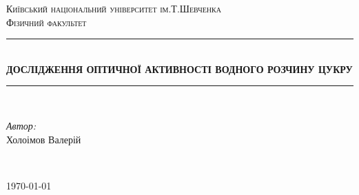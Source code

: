 \center
\newcommand{\HRule}{\rule{\linewidth}{0.3 mm}} %
\textsc{\Large Київський національний університет ім.Т.Шевченка }\\[1.5cm] %
\textsc{\Large Фізичний факультет}\\[2.5cm] %


\HRule \\[0.4cm]
{ \huge \bfseries ДОСЛІДЖЕННЯ ОПТИЧНОЇ АКТИВНОСТІ ВОДНОГО РОЗЧИНУ ЦУКРУ
}\\[0.4cm] %
\HRule \\[1.5cm]

\flushright
\begin{minipage}{0.4\textwidth}
\large
\emph{Автор:}\\ Холоімов Валерій %
\end{minipage}\\[12cm]
\center

{\large \today}\\[0cm] %
\flushleft

